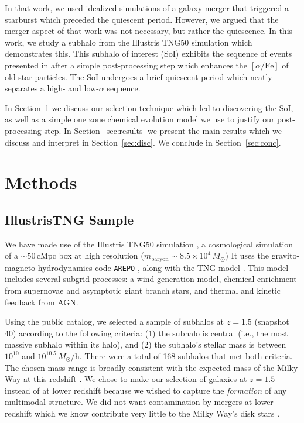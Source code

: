 \documentclass[linenumbers, twocolumn]{aastex631}
\newcommand{\Msun}{\ensuremath{M_{\odot}}}
\newcommand{\alphaFe}{\ensuremath{[\alpha/\textrm{Fe}]}}
\begin{document}
In that work, we used idealized simulations of a galaxy merger that triggered a starburst which preceded the quiescent period. However, we argued that the merger aspect of that work was not necessary, but rather the quiescence. In this work, we study a subhalo from the Illustris TNG50 simulation which demonstrates this. This subhalo of interest (SoI) exhibits the sequence of events presented in \citet{2024arXiv240707985B} after a simple post-processing step which enhances the \alphaFe{} of old star particles. The SoI undergoes a brief quiescent period which neatly separates a high- and low-$\alpha$ sequence.

In Section~\ref{sec:methods} we discuss our selection technique which led to discovering the SoI, as well as a simple one zone chemical evolution model we use to justify our post-processing step. In Section~\ref{sec:results} we present the main results which we discuss and interpret in Section~\ref{sec:disc}. We conclude in Section~\ref{sec:conc}.


\section{Methods}\label{sec:methods}
\subsection{IllustrisTNG Sample}\label{ssec:tng}
We have made use of the Illustris TNG50 simulation \citep{2019MNRAS.490.3196P, 2019MNRAS.490.3234N}, a cosmological simulation of a $\sim50\,\textrm{cMpc}$ box at high resolution ($m_{\textrm{baryon}}\sim8.5\times10^4\,\Msun$) It uses the gravito-magneto-hydrodynamics code \texttt{AREPO} \citep{2010MNRAS.401..791S, 2016MNRAS.455.1134P}, along with the TNG model \citep{2017MNRAS.465.3291W, 2018MNRAS.473.4077P}. This model includes several subgrid processes: a wind generation model, chemical enrichment from supernovae and asymptotic giant branch stars, and thermal and kinetic feedback from AGN.

Using the public catalog, we selected a sample of subhalos at $z=1.5$ (snapshot 40) according to the following criteria: (1) the subhalo is central (i.e., the most massive subhalo within its halo), and (2) the subhalo's stellar mass is between $10^{10}$ and $10^{10.5}\,\Msun/\textrm{h}$. There were a total of 168 subhalos that met both criteria. The chosen mass range is broadly consistent with the expected mass of the Milky Way at this redshift \citep{2013ApJ...771L..35V}. We chose to make our selection of galaxies at $z=1.5$ instead of at lower redshift because we wished to capture the \textit{formation} of any multimodal structure. We did not want contamination by mergers at lower redshift which we know contribute very little to the Milky Way's disk stars \citep[e.g.][]{2016ARA&A..54..529B}.
\end{document}

